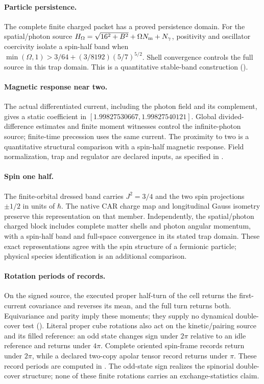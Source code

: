 \paragraph{Particle persistence.}
The complete finite charged packet has a proved persistence domain.
For the spatial/photon source
$H_\Omega=\sqrt{16^2+B^2}+\Omega N_{\rm m}+N_\gamma$,
positivity and oscillator coercivity isolate a spin-half band when
$\min(\Omega,1)>3/64+(3/8192)(5/7)^{5/2}$.
Shell convergence controls the full source in this trap domain.
This is a quantitative stable-band construction
().

\paragraph{Magnetic response near two.}
The actual differentiated current, including the photon field and its
complement, gives a static coefficient in
$[1.99827530667,1.99827540121]$. Global divided-difference estimates and
finite moment witnesses control the infinite-photon source; finite-time
precession uses the same current. The proximity to two is a quantitative
structural comparison with a spin-half magnetic response. Field normalization,
trap and regulator are declared inputs, as specified in
.

\paragraph{Spin one half.}
The finite-orbital dressed band carries $J^2=3/4$ and the two spin
projections $\pm1/2$ in units of $\hbar$. The native CAR charge map and
longitudinal Gauss isometry preserve this representation on that member.
Independently, the spatial/photon charged block includes complete matter
shells and photon angular momentum, with a spin-half band and full-space
convergence in its stated trap domain. These exact representations agree with the spin structure of a fermionic
particle; physical species identification is an additional comparison.

\paragraph{Rotation periods of records.}
On the signed source, the executed proper half-turn of the cell returns
the first-current covariance and reverses its mean, and the full turn
returns both. Equivariance and parity imply these moments; they supply no
dynamical double-cover test (). Literal proper cube
rotations also act on the kinetic/pairing source and its filled
reference: an odd state changes sign under $2\pi$ relative to an idle
reference and returns under $4\pi$. Complete oriented spin-frame records
return under $2\pi$, while a declared two-copy apolar tensor record
returns under $\pi$. These record periods are computed in
. The odd-state sign realizes the
spinorial double-cover structure; none of these finite rotations carries
an exchange-statistics claim.

